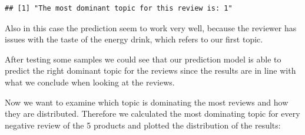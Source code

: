 \documentclass[
]{article}
\begin{document}
\begin{verbatim}
## [1] "The most dominant topic for this review is: 1"
\end{verbatim}

Also in this case the prediction seem to work very well, because the
reviewer has issues with the taste of the energy drink, which refers to
our first topic.

After testing some samples we could see that our prediction model is
able to predict the right dominant topic for the reviews since the
results are in line with what we conclude when looking at the reviews.

Now we want to examine which topic is dominating the most reviews and
how they are distributed. Therefore we calculated the most dominating
topic for every negative review of the 5 products and plotted the
distribution of the results:
\end{document}

